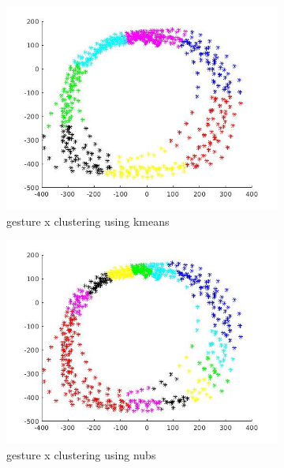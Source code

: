 \documentclass{article}
\begin{document}
\begin{figure}[ht]
	\begin{subfigure}{.5\textwidth}
		\centering
		\includegraphics[width=1.\linewidth]{kmean2.jpg}  
		\caption{gesture x clustering using kmeans}
	\end{subfigure}
	\begin{subfigure}{.5\textwidth}
		\centering
		\includegraphics[width=1.\linewidth]{nubs2.jpg}  
		\caption{gesture x clustering using nubs}
	\end{subfigure}
	\begin{subfigure}{.5\textwidth}
		\centering

\end{subfigure}
\end{figure}
\end{document}
